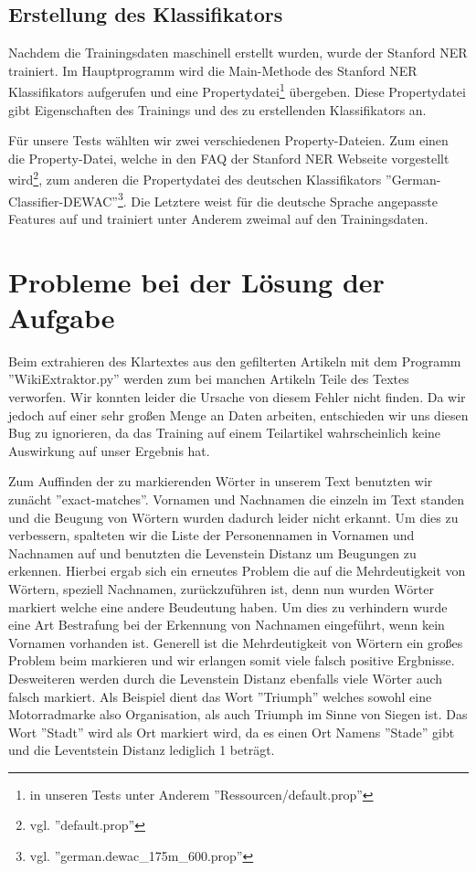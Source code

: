 \documentclass[a4paper]{article}
\begin{document}
	\subsection{Erstellung des Klassifikators}
		Nachdem die Trainingsdaten maschinell erstellt wurden, wurde der Stanford NER trainiert.
		Im Hauptprogramm wird die Main-Methode des Stanford NER Klassifikators aufgerufen und eine Propertydatei\footnote{in unseren Tests unter Anderem ''Ressourcen/default.prop''} übergeben. 
		Diese Propertydatei gibt Eigenschaften des Trainings und des zu erstellenden Klassifikators an. 
		
		Für unsere Tests wählten wir zwei verschiedenen Property-Dateien. 
		Zum einen die Property-Datei, welche in den FAQ der Stanford NER Webseite vorgestellt wird\footnote{vgl. ''default.prop''}, zum anderen die Propertydatei des deutschen Klassifikators ''German-Classifier-DEWAC''\footnote{vgl. ''german.dewac\_175m\_600.prop''}. 
		Die Letztere weist für die deutsche Sprache angepasste Features auf und trainiert unter Anderem zweimal auf den Trainingsdaten. 

\section{Probleme bei der Lösung der Aufgabe}
	Beim extrahieren des Klartextes aus den gefilterten Artikeln mit dem Programm ''WikiExtraktor.py'' werden zum bei manchen Artikeln Teile des Textes verworfen. 
	Wir konnten leider die Ursache von diesem Fehler nicht finden. 
	Da wir jedoch auf einer sehr großen Menge an Daten arbeiten, entschieden wir uns diesen Bug zu ignorieren, da das Training auf einem Teilartikel wahrscheinlich keine Auswirkung auf unser Ergebnis hat.
	
	Zum Auffinden der zu markierenden Wörter in unserem Text benutzten wir zunächt ''exact-matches''. Vornamen und Nachnamen die einzeln im Text standen und die Beugung von Wörtern wurden dadurch leider nicht erkannt. 
	Um dies zu verbessern, spalteten wir die Liste der Personennamen in Vornamen und Nachnamen auf und benutzten die Levenstein Distanz um Beugungen zu erkennen. 
	Hierbei ergab sich ein erneutes Problem die auf die Mehrdeutigkeit von Wörtern, speziell Nachnamen, zurückzuführen ist, denn nun wurden Wörter markiert welche eine andere Beudeutung haben. 
	Um dies zu verhindern wurde eine Art Bestrafung bei der Erkennung von Nachnamen eingeführt, wenn kein Vornamen vorhanden ist. 
	Generell ist die Mehrdeutigkeit von Wörtern ein großes Problem beim markieren und wir erlangen somit viele falsch positive Ergbnisse. 
	Desweiteren werden durch die Levenstein Distanz ebenfalls viele Wörter auch falsch markiert. 
	Als Beispiel dient das Wort ''Triumph'' welches sowohl eine Motorradmarke also Organisation, als auch Triumph im Sinne von Siegen ist. Das Wort ''Stadt'' wird als Ort markiert wird, da es einen Ort Namens ''Stade'' gibt und die Leventstein Distanz lediglich 1 beträgt.
	
\end{document}
